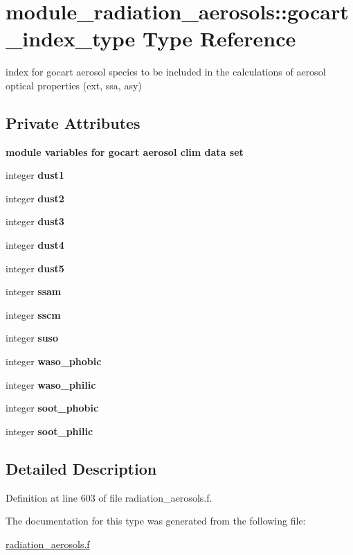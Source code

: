 \hypertarget{structmodule__radiation__aerosols_1_1gocart__index__type}{}\section{module\+\_\+radiation\+\_\+aerosols\+:\+:gocart\+\_\+index\+\_\+type Type Reference}
\label{structmodule__radiation__aerosols_1_1gocart__index__type}


index for gocart aerosol species to be included in the calculations of aerosol optical properties (ext, ssa, asy)  


\subsection*{Private Attributes}
\begin{Indent}\textbf{ module variables for gocart aerosol clim data set}\par
\begin{DoxyCompactItemize}
\item 
integer {\bfseries dust1}
\item 
integer {\bfseries dust2}
\item 
integer {\bfseries dust3}
\item 
integer {\bfseries dust4}
\item 
integer {\bfseries dust5}
\item 
integer {\bfseries ssam}
\item 
integer {\bfseries sscm}
\item 
integer {\bfseries suso}
\item 
integer {\bfseries waso\+\_\+phobic}
\item 
integer {\bfseries waso\+\_\+philic}
\item 
integer {\bfseries soot\+\_\+phobic}
\item 
integer {\bfseries soot\+\_\+philic}
\end{DoxyCompactItemize}
\end{Indent}


\subsection{Detailed Description}


Definition at line 603 of file radiation\+\_\+aerosols.\+f.



The documentation for this type was generated from the following file\+:\begin{DoxyCompactItemize}
\item 
\hyperlink{radiation__aerosols_8f}{radiation\+\_\+aerosols.\+f}\end{DoxyCompactItemize}
